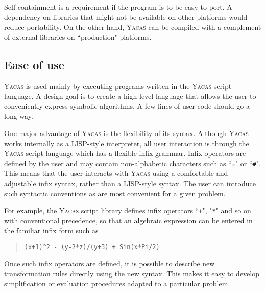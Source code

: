 \documentclass{llncs}
\begin{document}
Self-containment is a requirement if the program is to be easy to port. A
dependency on libraries that might not be available on other platforms would
reduce portability. On the other hand, \textsc{Yacas} can be compiled with a complement
of external libraries on ``production" platforms.

\subsection*{%
Ease of use}
\textsc{Yacas} is used mainly by executing programs written in the \textsc{Yacas} script
language. A design goal is to create a high-level language that allows the user
to conveniently express symbolic algorithms. A few lines of user code should go
a long way.

One major advantage of \textsc{Yacas} is the flexibility of its syntax. Although \textsc{Yacas}
works internally as a LISP-style interpreter, all user interaction is through
the \textsc{Yacas} script language which has a flexible infix grammar. Infix operators
are defined by the user and may contain non-alphabetic characters such as ``\small{\texttt{=}}"
or ``\small{\texttt{\#}}". This means that the user interacts with \textsc{Yacas} using a comfortable and adjustable infix syntax,
rather than a LISP-style syntax. The user can introduce such syntactic
conventions as are most convenient for a given problem.

For example, the \textsc{Yacas} script library defines infix operators ``\small{\texttt{+}}", "\small{\texttt{*}}" and so
on with conventional precedence, so that an algebraic expression can be entered
in the familiar infix form such as

\begin{quote}\small\begin{verbatim}
(x+1)^2 - (y-2*z)/(y+3) + Sin(x*Pi/2)
\end{verbatim}\end{quote}

Once such infix operators are defined, it is possible to describe new
transformation rules directly using the new syntax. This makes it easy to
develop simplification or evaluation procedures adapted to a particular
problem.
\end{document}
